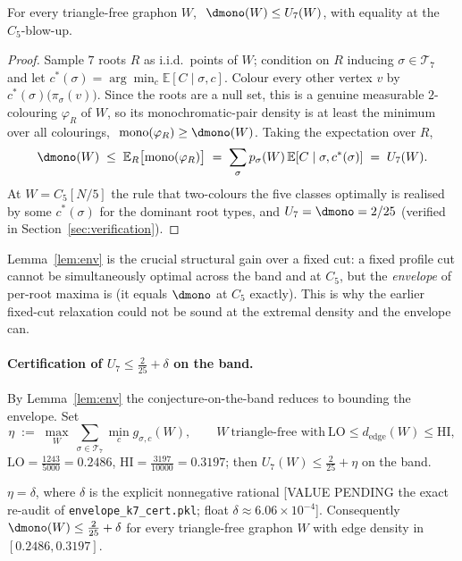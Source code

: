 \begin{lemma}\label{lem:env}
For every triangle-free graphon $W$, $\ \dmono(W)\le U_7(W)$, with equality at the
$C_5$-blow-up.
\end{lemma}

\begin{proof}
Sample $7$ roots $R$ as i.i.d.\ points of $W$; condition on $R$ inducing
$\sigma\in\mathcal{T}_7$ and let $c^\ast(\sigma)=\arg\min_c\mathbb{E}[C\mid\sigma,c]$.
Colour every other vertex $v$ by $c^\ast(\sigma)\bigl(\pi_\sigma(v)\bigr)$. Since the
roots are a null set, this is a genuine measurable $2$-colouring $\varphi_R$ of $W$,
so its monochromatic-pair density is at least the minimum over all colourings,
$\ \mathrm{mono}(\varphi_R)\ge \dmono(W)$. Taking the expectation over $R$,
\[
  \dmono(W)\;\le\;\mathbb{E}_R\bigl[\mathrm{mono}(\varphi_R)\bigr]
        \;=\;\sum_{\sigma}p_\sigma(W)\,\mathbb{E}[C\mid\sigma,c^\ast(\sigma)]
        \;=\;U_7(W).
\]
At $W=C_5[N/5]$ the rule that two-colours the five classes optimally is realised by
some $c^\ast(\sigma)$ for the dominant root types, and $U_7=\dmono=2/25$ (verified in
Section~\ref{sec:verification}).
\end{proof}

Lemma~\ref{lem:env} is the crucial structural gain over a fixed cut: a fixed
profile cut cannot be simultaneously optimal across the band and at $C_5$, but the
\emph{envelope} of per-root maxima is (it equals $\dmono$ at $C_5$ exactly). This is
why the earlier fixed-cut relaxation could not be sound at the extremal density and
the envelope can.

\paragraph{Certification of $U_7\le\frac{2}{25}+\delta$ on the band.} By
Lemma~\ref{lem:env} the conjecture-on-the-band reduces to bounding the envelope. Set
\[
  \eta\;:=\;\max_{W}\ \sum_{\sigma\in\mathcal{T}_7}\min_c g_{\sigma,c}(W),
  \qquad W\ \text{triangle-free with}\ \mathrm{LO}\le d_{\mathrm{edge}}(W)\le\mathrm{HI},
\]
$\mathrm{LO}=\tfrac{1243}{5000}=0.2486$, $\mathrm{HI}=\tfrac{3197}{10000}=0.3197$;
then $U_7(W)\le\tfrac{2}{25}+\eta$ on the band.

\begin{theorem}\label{thm:band}
$\eta=\delta$, where $\delta$ is the explicit nonnegative rational
[VALUE PENDING the exact re-audit of \texttt{envelope\_k7\_cert.pkl}; float
$\delta\approx 6.06\times10^{-4}$]. Consequently $\dmono(W)\le\tfrac{2}{25}+\delta$
for every triangle-free graphon $W$ with edge density in $[0.2486,0.3197]$.
\end{theorem}

